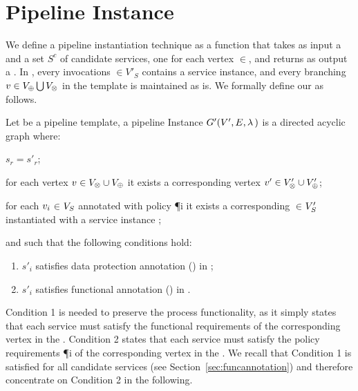 \section{Pipeline Instance}\label{sec:instance}
We define a pipeline instantiation technique as a function that takes as input a \pipelineTemplate \tChartFunction and a set $S^c$ of candidate services, one for each vertex $\in$\V, and returns as output a \pipelineInstance \iChartFunction.
In \iChartFunction, every invocations $\in$$V'_S$ contains a service instance, and every branching $v\in V_{\oplus}\bigcup V_{\otimes}$ in the template is maintained as is. We formally define our \pipelineInstance as follows.

    \begin{definition}\label{def:instance}
      Let \tChartFunction be a pipeline template, a pipeline Instance $G'(V',E,\lambda\,)$ is a directed acyclic graph where:
      \begin{enumerate*}[label=\textit{\roman*})]
        \item $s_r$$=$$s'_r$;
        \item for each vertex $v_{}\in V_{\otimes}\cup V_{\oplus}$ it exists a corresponding vertex $v'_{}\in V'_{\otimes}\cup V'_{\oplus}$;
        \item for each $v_{i}$$\in$$V_S$ annotated with policy \P{i} it exists a corresponding $\in$$V'_S$ instantiated with a service instance ;
      \end{enumerate*}
      and such that the following conditions hold:
      \begin{enumerate}[label=\arabic*)]
        \item $s'_i$ satisfies data protection annotation \myLambda() in \tChartFunction;
        \item $s'_i$ satisfies functional annotation \myGamma() in \tChartFunction.
      \end{enumerate}
    \end{definition}

    Condition 1 is needed to preserve the process functionality, as it simply states that each service  must satisfy the functional requirements  of the corresponding vertex  in the \pipelineTemplate.
    Condition 2 states that each service  must satisfy the policy requirements \P{i} of the corresponding vertex  in the \pipelineTemplate.
    We recall that Condition 1 is satisfied for all candidate services (see Section~\ref{sec:funcannotation}) and therefore concentrate on Condition 2 in the following.


